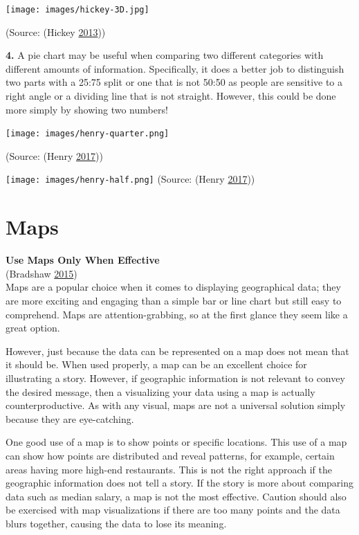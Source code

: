 \documentclass[]{book}
\begin{document}
\texttt{[image: images/hickey-3D.jpg]}

(Source: (Hickey \protect\hyperlink{ref-hickey-pie-worst}{2013}))

\textbf{4.} A pie chart may be useful when comparing two different categories with different amounts of information. Specifically, it does a better job to distinguish two parts with a 25:75 split or one that is not 50:50 as people are sensitive to a right angle or a dividing line that is not straight. However, this could be done more simply by showing two numbers!

\texttt{[image: images/henry-quarter.png]}

(Source: (Henry \protect\hyperlink{ref-henry-defense-pie}{2017}))

\texttt{[image: images/henry-half.png]}
(Source: (Henry \protect\hyperlink{ref-henry-defense-pie}{2017}))

\hypertarget{maps}{%
\section{Maps}\label{maps}}

\textbf{Use Maps Only When Effective}\\
(Bradshaw \protect\hyperlink{ref-Bradshaw}{2015})\\
Maps are a popular choice when it comes to displaying geographical data; they are more exciting and engaging than a simple bar or line chart but still easy to comprehend. Maps are attention-grabbing, so at the first glance they seem like a great option.

However, just because the data can be represented on a map does not mean that it should be. When used properly, a map can be an excellent choice for illustrating a story. However, if geographic information is not relevant to convey the desired message, then a visualizing your data using a map is actually counterproductive. As with any visual, maps are not a universal solution simply because they are eye-catching.

One good use of a map is to show points or specific locations. This use of a map can show how points are distributed and reveal patterns, for example, certain areas having more high-end restaurants. This is not the right approach if the geographic information does not tell a story. If the story is more about comparing data such as median salary, a map is not the most effective. Caution should also be exercised with map visualizations if there are too many points and the data blurs together, causing the data to lose its meaning.
\end{document}
